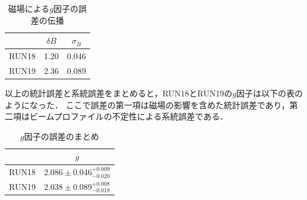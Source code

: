 \begin{table}[H]%
  \caption{磁場による$g$因子の誤差の伝播}
  \centering
    \begin{tabular}{ccc}\toprule
      & $\delta B$ &  $\sigma_{B}$  \\ \midrule
      RUN18 & 1.20 & 0.046  \\
      RUN19 & 2.36 & 0.089 \\ \bottomrule
    \end{tabular}
    \label{tab:g_error}
\end{table}

以上の統計誤差と系統誤差をまとめると，RUN18とRUN19の$g$因子は以下の表のようになった．
ここで誤差の第一項は磁場の影響を含めた統計誤差であり，第二項はビームプロファイルの不定性による系統誤差である．

\begin{table}[H]%
  \caption{$g$因子の誤差のまとめ}
  \centering
  \begingroup
  \renewcommand{\arraystretch}{1.2}%
  \begin{tabular}{cc}\toprule
    &   $g$  \\ \midrule
    RUN18 & $2.086 \pm 0.046^{+0.009}_{-0.020} $  \\
    RUN19 & $2.038 \pm 0.089^{+0.008}_{-0.018} $  \\ \bottomrule
  \end{tabular}
  \endgroup
\end{table}

%
